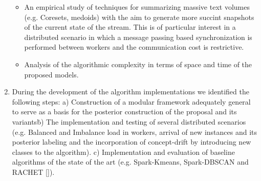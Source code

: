 \documentclass[10pt]{article}
\begin{document}
\begin{enumerate}
\begin{itemize}
\item An empirical study of techniques for summarizing massive text volumes (e.g. Coresets, medoids) with the aim to generate more succint snapshots of the current state of the stream. This is of particular interest in a distributed scenario in which a message passing based synchronization is performed between workers and the communication cost is restrictive. 

\item Analysis of the algorithmic complexity in terms of space and time of the proposed models.

\end{itemize}
\item During the development of the algorithm implementations we identified the following steps: a) Construction of a modular framework adequately general to serve as a basis for the posterior construction of the proposal and its variants\. b) The implementation and testing of several distributed scenarios (e.g. Balanced and Imbalance load in workers, arrival of new instances and its posterior labeling and the incorporation of concept-drift by introducing new classes to the algorithm). c) Implementation and evaluation of baseline algorithms of the state of the art (e.g. Spark-Kmeans, Spark-DBSCAN and RACHET [\cite{SOGM02}]).%


\end{enumerate}
\end{document}
